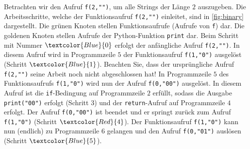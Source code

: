 \noindent
Betrachten wir den Aufruf \lstinline|f(2,"")|, um alle Strings der Länge $2$ auszugeben. Die Arbeitsschritte, welche der Funktionsaufruf \lstinline|f(2,"")| einleitet, sind in \cref{fig:binary} dargestellt. Die \textcolor{Green!55}{grünen} Knoten stellen Funktionsaufrufe (Aufrufe von \lstinline|f|) dar. Die \textcolor{Gold!85}{goldenen} Knoten stellen Aufrufe der Python-Funktion \lstinline|print| dar. Beim Schritt mit Nummer $\textcolor{Blue}{0}$ erfolgt der anfängliche Aufruf \lstinline|f(2,"")|. In diesem Aufruf wird in Programmzeile $5$ der Funktionsaufruf \lstinline|f(1,"0")| ausgelöst (Schritt $\textcolor{Blue}{1}$). Beachten Sie, dass der ursprüngliche Aufruf \lstinline|f(2,"")| seine Arbeit noch nicht abgeschlossen hat! In Programmzeile $5$ des Funktionsaufrufs \lstinline|f(1,"0")| wird nun der Aufruf \lstinline|f(0,"00")| ausgelöst. In diesem Aufruf ist die \lstinline|if|-Bedingung auf Programmzeile $2$ erfüllt, sodass die Ausgabe \lstinline|print("00")| erfolgt (Schritt $3$) und der \lstinline|return|-Aufruf auf Programmzeile $4$ erfolgt. Der Aufruf \lstinline|f(0,"00")| ist beendet und er springt zurück zum Aufruf \lstinline|f(1,"0")| (Schritt $\textcolor{Red}{4}$). Der Funktionsaufruf \lstinline|f(1,"0")| kann nun (endlich) zu Programmzeile $6$ gelangen und den Aufruf \lstinline|f(0,"01")| auslösen (Schritt $\textcolor{Blue}{5}$).

